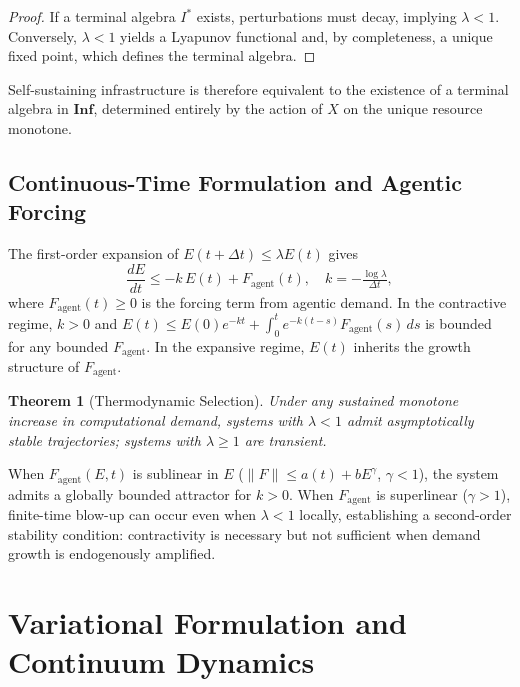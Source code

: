 \documentclass[10pt,twocolumn]{article}
\theoremstyle{plain}
\newtheorem{theorem}{Theorem}
\theoremstyle{definition}
\theoremstyle{remark}
\begin{document}
\begin{proof}
If a terminal algebra $I^*$ exists, perturbations must decay, implying
$\lambda < 1$. Conversely, $\lambda < 1$ yields a Lyapunov functional
and, by completeness, a unique fixed point, which defines the terminal
algebra.
\end{proof}

Self-sustaining infrastructure is therefore equivalent to the existence
of a terminal algebra in $\mathbf{Inf}$, determined entirely by the
action of $X$ on the unique resource monotone.

\subsection{Continuous-Time Formulation and Agentic Forcing}

The first-order expansion of $E(t + \Delta t) \leq \lambda E(t)$ gives
\[
  \frac{dE}{dt} \leq -k\,E(t) + F_{\mathrm{agent}}(t),
  \quad k = -\tfrac{\log\lambda}{\Delta t},
\]
where $F_{\mathrm{agent}}(t) \geq 0$ is the forcing term from agentic
demand. In the contractive regime, $k > 0$ and
$E(t) \leq E(0)e^{-kt} + \int_0^t e^{-k(t-s)} F_{\mathrm{agent}}(s)\,ds$
is bounded for any bounded $F_{\mathrm{agent}}$. In the expansive
regime, $E(t)$ inherits the growth structure of $F_{\mathrm{agent}}$.

\begin{theorem}[Thermodynamic Selection]
\label{thm:selection}
Under any sustained monotone increase in computational demand,
systems with $\lambda < 1$ admit asymptotically stable trajectories;
systems with $\lambda \geq 1$ are transient.
\end{theorem}

When $F_{\mathrm{agent}}(E, t)$ is sublinear in $E$ ($\|F\| \leq a(t) +
bE^\gamma$, $\gamma < 1$), the system admits a globally bounded attractor
for $k > 0$. When $F_{\mathrm{agent}}$ is superlinear ($\gamma > 1$),
finite-time blow-up can occur even when $\lambda < 1$ locally,
establishing a second-order stability condition: contractivity is
necessary but not sufficient when demand growth is endogenously
amplified.

\section{Variational Formulation and Continuum Dynamics}
\end{document}
